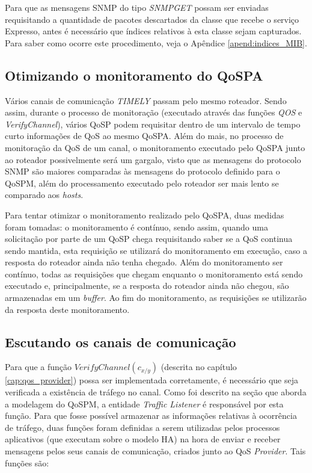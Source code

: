 	Para que as mensagens SNMP do tipo \textit{SNMPGET} possam ser enviadas requisitando a quantidade de pacotes descartados da classe que recebe o serviço Expresso, antes é necessário que índices relativos à esta classe sejam capturados. Para saber como ocorre este procedimento, veja o Apêndice \ref{apend:indices_MIB}.

\subsection{Otimizando o monitoramento do QoSPA}	

	Vários canais de comunicação \textit{TIMELY} passam pelo mesmo roteador. Sendo assim, durante o processo de monitoração (executado através das funções \textit{QOS} e \textit{VerifyChannel}), vários QoSP podem requisitar dentro de um intervalo de tempo curto informações de QoS ao mesmo QoSPA. Além do mais, no processo de monitoração da QoS de um canal, o monitoramento executado pelo QoSPA junto ao roteador possivelmente será um gargalo, visto que as mensagens do protocolo SNMP são maiores comparadas às mensagens do protocolo definido para o QoSPM, além do processamento executado pelo roteador ser mais lento se comparado aos \textit{hosts}.
	
	Para tentar otimizar o monitoramento realizado pelo QoSPA, duas medidas foram tomadas: o monitoramento é contínuo, sendo assim, quando uma solicitação por parte de um QoSP chega requisitando saber se a QoS continua sendo mantida, esta requisição se utilizará do monitoramento em execução, caso a resposta do roteador ainda não tenha chegado. Além do monitoramento ser contínuo, todas as requisições que chegam enquanto o monitoramento está sendo executado e, principalmente, se a resposta do roteador ainda não chegou, são armazenadas em um \textit{buffer}. Ao fim do monitoramento, as requisições se utilizarão da resposta deste monitoramento.

\subsection{Escutando os canais de comunicação}	

	Para que a função $VerifyChannel(c_{x/y})$ (descrita no capítulo \ref{cap:qos_provider}) possa ser implementada corretamente, é necessário que seja verificada a existência de tráfego no canal. Como foi descrito na seção que aborda a modelagem do QoSPM, a entidade \textit{Traffic Listener} é responsável por esta função. Para que fosse possível armazenar as informações relativas à ocorrência de tráfego, duas funções foram definidas a serem utilizadas pelos processos aplicativos (que executam sobre o modelo HA) na hora de enviar e receber mensagens pelos seus canais de comunicação, criados junto ao QoS \textit{Provider}. Tais funções são:
	
